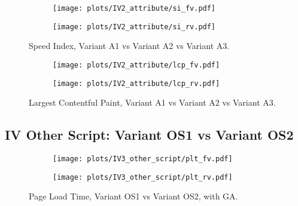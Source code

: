 

\begin{figure}
	\centering
	\begin{subfigure}{.5\textwidth}
		\centering
		\texttt{[image: plots/IV2\_attribute/si\_fv.pdf]}
		\label{fig:sub1}
	\end{subfigure}%
	\begin{subfigure}{.5\textwidth}
		\centering
		\texttt{[image: plots/IV2\_attribute/si\_rv.pdf]}
		\label{fig:sub2}
	\end{subfigure}
	\caption{Speed Index, Variant A1 vs Variant A2 vs Variant A3.}
	\label{figure:plt_original_test}
\end{figure}


\begin{figure}
	\centering
	\begin{subfigure}{.5\textwidth}
		\centering
		\texttt{[image: plots/IV2\_attribute/lcp\_fv.pdf]}
		\label{fig:sub1}
	\end{subfigure}%
	\begin{subfigure}{.5\textwidth}
		\centering
		\texttt{[image: plots/IV2\_attribute/lcp\_rv.pdf]}
		\label{fig:sub2}
	\end{subfigure}
	\caption{Largest Contentful Paint, Variant A1 vs Variant A2 vs Variant A3.}
	\label{figure:plt_original_test}
\end{figure}







\subsection{IV Other Script: Variant OS1 vs Variant OS2}





\begin{figure}
	\centering
	\begin{subfigure}{.5\textwidth}
		\centering
		\texttt{[image: plots/IV3\_other\_script/plt\_fv.pdf]}
		\label{fig:sub1}
	\end{subfigure}%
	\begin{subfigure}{.5\textwidth}
		\centering
		\texttt{[image: plots/IV3\_other\_script/plt\_rv.pdf]}
		\label{fig:sub2}
	\end{subfigure}
	\caption{Page Load Time, Variant OS1 vs Variant OS2, with GA.}
	\label{figure:plt_original_test}
\end{figure}


